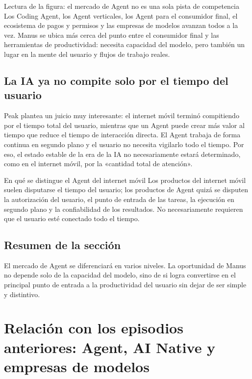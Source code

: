 \documentclass[a4paper]{article}
\begin{document}
\begin{knowledgebox}{Lectura de la figura: el mercado de Agent no es una sola pista de competencia}
Los Coding Agent, los Agent verticales, los Agent para el consumidor final, el ecosistema de pagos y permisos y las empresas de modelos avanzan todos a la vez. Manus se ubica más cerca del punto entre el consumidor final y las herramientas de productividad: necesita capacidad del modelo, pero también un lugar en la mente del usuario y flujos de trabajo reales.
\end{knowledgebox}

\subsection{La IA ya no compite solo por el tiempo del usuario}

Peak plantea un juicio muy interesante: el internet móvil terminó compitiendo por el tiempo total del usuario, mientras que un Agent puede crear más valor al tiempo que reduce el tiempo de interacción directa. El Agent trabaja de forma continua en segundo plano y el usuario no necesita vigilarlo todo el tiempo. Por eso, el estado estable de la era de la IA no necesariamente estará determinado, como en el internet móvil, por la «cantidad total de atención».

\begin{knowledgebox}{En qué se distingue el Agent del internet móvil}
Los productos del internet móvil suelen disputarse el tiempo del usuario; los productos de Agent quizá se disputen la autorización del usuario, el punto de entrada de las tareas, la ejecución en segundo plano y la confiabilidad de los resultados. No necesariamente requieren que el usuario esté conectado todo el tiempo.
\end{knowledgebox}

\subsection{Resumen de la sección}

El mercado de Agent se diferenciará en varios niveles. La oportunidad de Manus no depende solo de la capacidad del modelo, sino de si logra convertirse en el principal punto de entrada a la productividad del usuario sin dejar de ser simple y distintivo.
\section{Relación con los episodios anteriores: Agent, AI Native y empresas de modelos}
\end{document}
